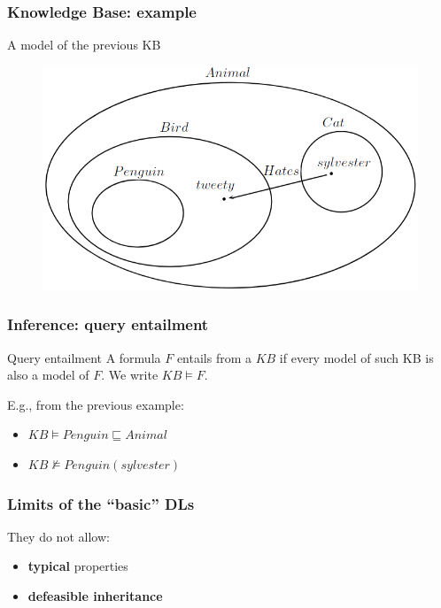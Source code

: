 \documentclass[serif,mathserif]{beamer}
\begin{document}
\begin{frame}
	\frametitle{Knowledge Base: example}

	A model of the previous KB
	\begin{figure}[htp]
	\centering
	\includegraphics[scale=0.30]{img/diagram1_5.png}
	\end{figure}
\end{frame}

\begin{frame}
	\frametitle{Inference: query entailment}
	\begin{block}{Query entailment}
	A formula $F$ entails from a $KB$ if every model of such KB is also a model of $F$. We write $KB \models F$.
	\end{block}
	
	E.g., from the previous example:
	\begin{itemize}
		\item $KB \models Penguin \sqsubseteq Animal$
		\item $KB \not\models Penguin(sylvester)$
	\end{itemize}
\end{frame}

\begin{frame}
	\frametitle{Limits of the ``basic'' DLs}
	They do not allow:
	\begin{itemize}
	\item \textbf{typical} properties
	\item \textbf{defeasible inheritance}
%	
	\end{itemize}
\end{frame}
\end{document}

